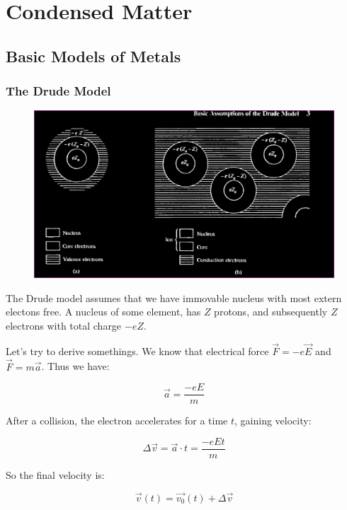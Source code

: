 \part{Condensed Matter}
\chapter{Basic Models of Metals}

\section{The Drude Model}


\begin{figure}[htbp]
  \centering
  \includegraphics[width=\linewidth]{images/basic_assumptions.png}
\end{figure}

The Drude model assumes that we have immovable nucleus with most extern electons free. A nucleus of some element, has $Z$ protons, and subsequently $Z$ electrons with total charge $-eZ$. 

Let's try to derive somethings. We know that electrical force $\vec{F} = -e\vec{E}$ and $\vec{F} = m\vec{a}$. Thus we have:

\begin{equation}
  \vec{a} = \frac{-eE}{m}
\end{equation}

After a collision, the electron accelerates for a time $t$, gaining velocity:

\begin{equation}
  \Delta{\vec{v}} = \vec{a}\cdot t = \frac{-eEt}{m}
\end{equation}

So the final velocity is:

\begin{equation}
  \vec{v}(t) = \vec{v_0}(t) + \Delta{\vec{v}}
\end{equation}


